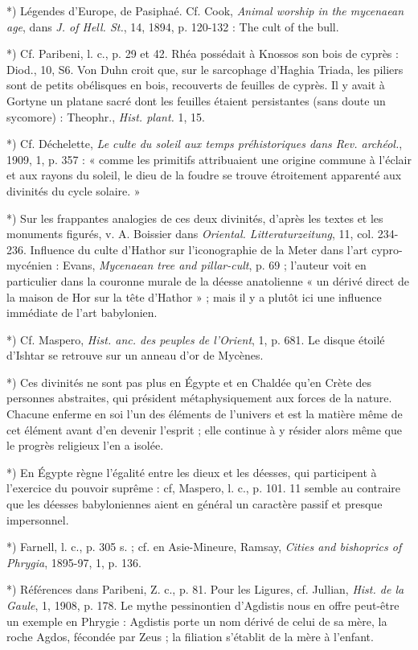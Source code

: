 \documentclass[a4paper, 11pt, oneside, polutonikogreek, french]{article}
\begin{document}
*) Légendes d'Europe, de Pasiphaé. Cf. Cook, \emph{Animal worship in the mycenaean age}, dans \emph{J. of Hell. St.}, 14, 1894, p. 120-132 : The cult of the bull.

*) Cf. Paribeni, l. c., p. 29 et 42. Rhéa possédait à Knossos son bois de cyprès : Diod., 10, S6. Von Duhn croit que, sur le sarcophage d'Haghia Triada, les piliers sont de petits obélisques en bois, recouverts de feuilles de cyprès. Il y avait à Gortyne un platane sacré dont les feuilles étaient persistantes (sans doute un sycomore) : Theophr., \emph{Hist. plant.} 1, 15.

*) Cf. Déchelette, \emph{Le culte du soleil aux temps préhistoriques dans Rev. archéol.}, 1909, 1, p. 357 : « comme les primitifs attribuaient une origine commune à l'éclair et aux rayons du soleil, le dieu de la foudre se trouve étroitement apparenté aux divinités du cycle solaire. »

*) Sur les frappantes analogies de ces deux divinités, d'après les textes et les monuments figurés, v. A. Boissier dans \emph{Oriental. Litteraturzeitung}, 11, col. 234-236. Influence du culte d'Hathor sur l'iconographie de la Meter dans l'art cypro-mycénien : Evans, \emph{Mycenaean tree and pillar-cult}, p. 69 ; l'auteur voit en particulier dans la couronne murale de la déesse anatolienne « un dérivé direct de la maison de Hor sur la tête d'Hathor » ; mais il y a plutôt ici une influence immédiate de l'art babylonien.

*) Cf. Maspero, \emph{Hist. anc. des peuples de l'Orient}, 1, p. 681. Le disque étoilé d'Ishtar se retrouve sur un anneau d'or de Mycènes.

*) Ces divinités ne sont pas plus en Égypte et en Chaldée qu'en Crète des personnes abstraites, qui président métaphysiquement aux forces de la nature. Chacune enferme en soi l'un des éléments de l'univers et est la matière même de cet élément avant d'en devenir l'esprit ; elle continue à y résider alors même que le progrès religieux l'en a isolée.

*) En Égypte règne l'égalité entre les dieux et les déesses, qui participent à l'exercice du pouvoir suprême : cf, Maspero, l. c., p. 101. 11 semble au contraire que les déesses babyloniennes aient en général un caractère passif et presque impersonnel.

*) Farnell, l. c., p. 305 s. ; cf. en Asie-Mineure, Ramsay, \emph{Cities and bishoprics of Phrygia}, 1895-97, 1, p. 136.

*) Références dans Paribeni, Z. c., p. 81. Pour les Ligures, cf. Jullian, \emph{Hist. de la Gaule}, 1, 1908, p. 178. Le mythe pessinontien d'Agdistis nous en offre peut-être un exemple en Phrygie : Agdistis porte un nom dérivé de celui de sa mère, la roche Agdos, fécondée par Zeus ; la filiation s'établit de la mère à l'enfant.
\end{document}

